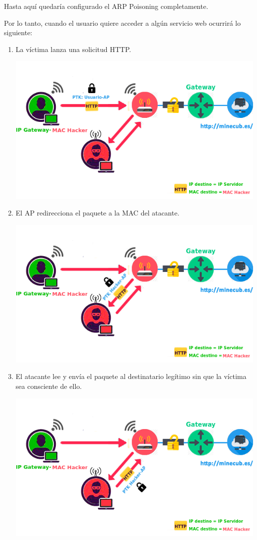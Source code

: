 Hasta aquí quedaría configurado el ARP Poisoning completamente.

Por lo tanto, cuando el usuario quiere acceder a algún servicio web ocurrirá lo siguiente:
\newpage
\begin{enumerate}
	\item La víctima lanza una solicitud HTTP.
	\begin{center}
		\includegraphics[scale=0.7]{ARPpoison3.png}
	\end{center}
	\item El AP redirecciona el paquete a la MAC del atacante.
	\begin{center}
		\includegraphics[scale=0.7]{ARPpoison3-2.png}
	\end{center}
\newpage
	\item El atacante lee y envía el paquete al destinatario legítimo sin que la víctima sea consciente de ello.
	\begin{center}
		\includegraphics[scale=0.7]{ARPpoison3-3.png}
	\end{center}
\end{enumerate}

